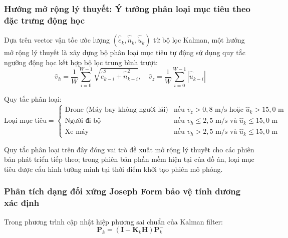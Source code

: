 \subsubsection{Hướng mở rộng lý thuyết: Ý tưởng phân loại mục tiêu theo đặc trưng động học}

\hspace{0.5cm} Dựa trên vector vận tốc ước lượng $(\hat{\dot{e}}_k, \hat{\dot{n}}_k, \hat{\dot{u}}_k)$ từ bộ lọc Kalman, một hướng mở rộng lý thuyết là xây dựng bộ phân loại mục tiêu tự động sử dụng quy tắc ngưỡng động học kết hợp bộ lọc trung bình trượt:
\begin{equation}
\bar{v}_h = \frac{1}{W}\sum_{i=0}^{W-1} \sqrt{\hat{\dot{e}}_{k-i}^2 + \hat{\dot{n}}_{k-i}^2}, \quad \bar{v}_z = \frac{1}{W}\sum_{i=0}^{W-1} |\hat{\dot{u}}_{k-i}|
\label{eq:average-velocity-features}
\end{equation}

Quy tắc phân loại:
\begin{equation}
\text{Loại mục tiêu} = \begin{cases}
\text{Drone (Máy bay không người lái)} & \text{nếu } \bar{v}_z > 0{,}8\text{ m/s} \text{ hoặc } \hat{u}_k > 15{,}0\text{ m} \\
\text{Người đi bộ} & \text{nếu } \bar{v}_h \le 2{,}5\text{ m/s} \text{ và } \hat{u}_k \le 15{,}0\text{ m} \\
\text{Xe máy} & \text{nếu } \bar{v}_h > 2{,}5\text{ m/s} \text{ và } \hat{u}_k \le 15{,}0\text{ m}
\end{cases}
\label{eq:target-classification-rule}
\end{equation}

Quy tắc phân loại trên đây đóng vai trò đề xuất mở rộng lý thuyết cho các phiên bản phát triển tiếp theo; trong phiên bản phần mềm hiện tại của đồ án, loại mục tiêu được cấu hình tường minh tại thời điểm khởi tạo phiên mô phỏng.

\subsubsection{Phân tích dạng đối xứng Joseph Form bảo vệ tính dương xác định}

\hspace{0.5cm} Trong phương trình cập nhật hiệp phương sai chuẩn của Kalman filter:
\begin{equation}
\mathbf{P}_k = (\mathbf{I} - \mathbf{K}_k \mathbf{H}) \mathbf{P}_k^-
\label{eq:standard-p-update}
\end{equation}

